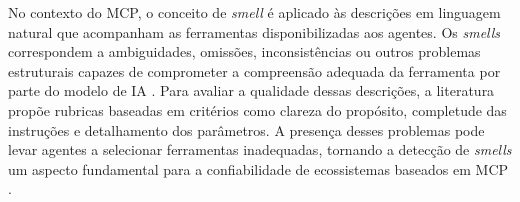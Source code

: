 No contexto do MCP, o conceito de \textit{smell} é aplicado às descrições em linguagem natural que acompanham as ferramentas disponibilizadas aos agentes. Os \textit{smells} correspondem a ambiguidades, omissões, inconsistências ou outros problemas estruturais capazes de comprometer a compreensão adequada da ferramenta por parte do modelo de IA \cite{2026arXiv260214878M}. Para avaliar a qualidade dessas descrições, a literatura propõe rubricas baseadas em critérios como clareza do propósito, completude das instruções e detalhamento dos parâmetros. A presença desses problemas pode levar agentes a selecionar ferramentas inadequadas, tornando a detecção de \textit{smells} um aspecto fundamental para a confiabilidade de ecossistemas baseados em MCP \cite{2026arXiv260214878M}.